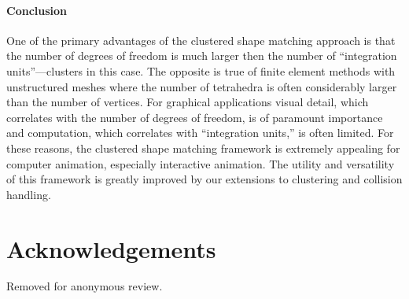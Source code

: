 \documentclass[review]{acmsiggraph}
\begin{document}
\paragraph{Conclusion} 
One of the primary advantages of the clustered shape matching approach is that the number of degrees of freedom
is much larger then the number of ``integration units''---clusters in this case.  The opposite is true of finite element
methods with unstructured meshes where the number of tetrahedra is often considerably larger than the number of vertices.  
For graphical applications visual detail, which correlates with the number of degrees of freedom, is of paramount importance
and computation, which correlates with ``integration units,'' is often limited.  
For these reasons, the clustered shape matching framework is extremely appealing for computer animation, 
especially interactive animation.  The utility and versatility of this framework is greatly improved by our extensions 
to clustering and collision handling.




\section*{Acknowledgements}
Removed for anonymous review.



\end{document}
